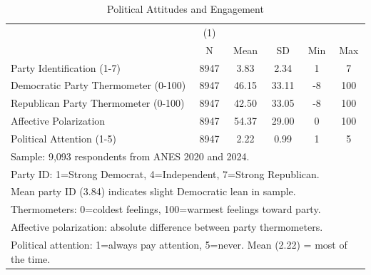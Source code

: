 \begin{table}[htbp]\centering
\def\sym#1{\ifmmode^{#1}\else\(^{#1}\)\fi}
\caption{Political Attitudes and Engagement}
\begin{tabular}{l*{1}{ccccc}}
\toprule
                    &\multicolumn{1}{c}{(1)}&            &            &            &            \\
                    &           N&        Mean&          SD&         Min&         Max\\
\midrule
Party Identification (1-7)&        8947&        3.83&        2.34&           1&           7\\
Democratic Party Thermometer (0-100)&        8947&       46.15&       33.11&          -8&         100\\
Republican Party Thermometer (0-100)&        8947&       42.50&       33.05&          -8&         100\\
Affective Polarization&        8947&       54.37&       29.00&           0&         100\\
Political Attention (1-5)&        8947&        2.22&        0.99&           1&           5\\
\bottomrule
\multicolumn{6}{l}{\footnotesize Sample: 9,093 respondents from ANES 2020 and 2024.}\\
\multicolumn{6}{l}{\footnotesize Party ID: 1=Strong Democrat, 4=Independent, 7=Strong Republican.}\\
\multicolumn{6}{l}{\footnotesize Mean party ID (3.84) indicates slight Democratic lean in sample.}\\
\multicolumn{6}{l}{\footnotesize Thermometers: 0=coldest feelings, 100=warmest feelings toward party.}\\
\multicolumn{6}{l}{\footnotesize Affective polarization: absolute difference between party thermometers.}\\
\multicolumn{6}{l}{\footnotesize Political attention: 1=always pay attention, 5=never. Mean (2.22) = most of the time.}\\
\end{tabular}
\end{table}
